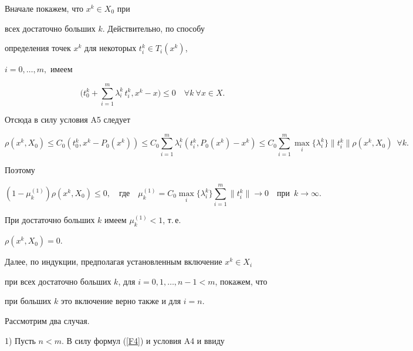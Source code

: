 \begin{pf} Вначале покажем, что $x^k\in X_0$ при


всех достаточно больших $k$. Действительно, по способу


определения точек $x^k$ для некоторых $t^k_i\in T_i(x^k)$,


$i=0,\dotsc,m,$ имеем


\begin{equation}


\label{F4}


\bigg(t_0^k+\sum^m_{i=1}\lambda_i^k\,t_i^k, x^k-x\bigg)\le 0


\quad \forall k\ \forall x\in X.


\end{equation}


Отсюда в силу условия A5 следует


$$


\rho(x^k, X_0)\le C_0(t_0^k, x^k-P_0(x^k))\le


C_0\sum^m_{i=1} \lambda_i^k (t_i^k, P_0(x^k)-x^k)\le 


C_0\sum^m_{i=1} \max_i \{\lambda_i^k\}\|t_i^k\|\rho(x^k, X_0)\ \; \forall k.


$$


Поэтому


$$


(1-\mu^{(1)}_k) \rho(x^k, X_0)\le 0,\quad \text{где} \quad


\mu^{(1)}_k=C_0\max_i\{\lambda_i^k\}\sum^m_{i=1}\|t_i^k\|\to 0 \quad


\text{при}\ \; k\to\infty.


$$


При достаточно больших $k$ имеем $\mu^{(1)}_k<1$, т.\,е.


$\rho(x^k,X_0)=0$.





Далее, по индукции, предполагая установленным включение $x^k\in X_i$


при всех достаточно больших $k$, для $i=0,1,\dotsc,n-1<m$, покажем, что


при больших $k$ это включение верно также и для $i=n$.





Рассмотрим два случая.





1) Пусть $n<m$. В силу формул (\ref{F4}) и условия A4 и ввиду



\end{pf}

